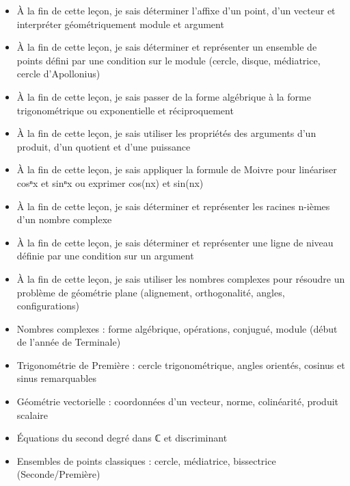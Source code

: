 \documentclass[11pt]{article}
\begin{document}
\begin{objectifs}
\begin{itemize}
\item À la fin de cette leçon, je sais déterminer l'affixe d'un point, d'un vecteur et interpréter géométriquement module et argument
\item À la fin de cette leçon, je sais déterminer et représenter un ensemble de points défini par une condition sur le module (cercle, disque, médiatrice, cercle d'Apollonius)
\item À la fin de cette leçon, je sais passer de la forme algébrique à la forme trigonométrique ou exponentielle et réciproquement
\item À la fin de cette leçon, je sais utiliser les propriétés des arguments d'un produit, d'un quotient et d'une puissance
\item À la fin de cette leçon, je sais appliquer la formule de Moivre pour linéariser cosⁿx et sinⁿx ou exprimer cos(nx) et sin(nx)
\item À la fin de cette leçon, je sais déterminer et représenter les racines n-ièmes d'un nombre complexe
\item À la fin de cette leçon, je sais déterminer et représenter une ligne de niveau définie par une condition sur un argument
\item À la fin de cette leçon, je sais utiliser les nombres complexes pour résoudre un problème de géométrie plane (alignement, orthogonalité, angles, configurations)
\end{itemize}
\end{objectifs}

\begin{prerequis}
\begin{itemize}
\item Nombres complexes : forme algébrique, opérations, conjugué, module (début de l'année de Terminale)
\item Trigonométrie de Première : cercle trigonométrique, angles orientés, cosinus et sinus remarquables
\item Géométrie vectorielle : coordonnées d'un vecteur, norme, colinéarité, produit scalaire
\item Équations du second degré dans ℂ et discriminant
\item Ensembles de points classiques : cercle, médiatrice, bissectrice (Seconde/Première)
\end{itemize}
\end{prerequis}

\newpage
\end{document}
